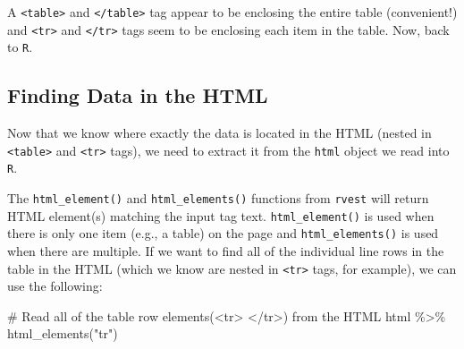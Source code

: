\documentclass[
  letterpaper,
]{book}
\newenvironment{Shaded}{\begin{snugshade}}{\end{snugshade}}
\newcommand{\CommentTok}[1]{\textcolor[rgb]{0.37,0.37,0.37}{#1}}
\newcommand{\FunctionTok}[1]{\textcolor[rgb]{0.28,0.35,0.67}{#1}}
\newcommand{\NormalTok}[1]{\textcolor[rgb]{0.00,0.23,0.31}{#1}}
\newcommand{\SpecialCharTok}[1]{\textcolor[rgb]{0.37,0.37,0.37}{#1}}
\newcommand{\StringTok}[1]{\textcolor[rgb]{0.13,0.47,0.30}{#1}}
\begin{document}
A \texttt{\textless{}table\textgreater{}} and
\texttt{\textless{}/table\textgreater{}} tag appear to be enclosing the
entire table (convenient!) and \texttt{\textless{}tr\textgreater{}} and
\texttt{\textless{}/tr\textgreater{}} tags seem to be enclosing each
item in the table. Now, back to \texttt{R}.

\hypertarget{finding-data-in-the-html}{%
\subsection{Finding Data in the HTML}\label{finding-data-in-the-html}}

Now that we know where exactly the data is located in the HTML (nested
in \texttt{\textless{}table\textgreater{}} and
\texttt{\textless{}tr\textgreater{}} tags), we need to extract it from
the \texttt{html} object we read into \texttt{R}.

The \texttt{html\_element()} and \texttt{html\_elements()} functions
from \texttt{rvest} will return HTML element(s) matching the input tag
text. \texttt{html\_element()} is used when there is only one item
(e.g., a table) on the page and \texttt{html\_elements()} is used when
there are multiple. If we want to find all of the individual line rows
in the table in the HTML (which we know are nested in
\texttt{\textless{}tr\textgreater{}} tags, for example), we can use the
following:

\begin{Shaded}
\begin{Highlighting}[]
\CommentTok{\# Read all of the table row elements(\textless{}tr\textgreater{} \textless{}/tr\textgreater{}) from the HTML}
\NormalTok{html }\SpecialCharTok{\%\textgreater{}\%}
  \FunctionTok{html\_elements}\NormalTok{(}\StringTok{"tr"}\NormalTok{)}
\end{Highlighting}
\end{Shaded}
\end{document}
